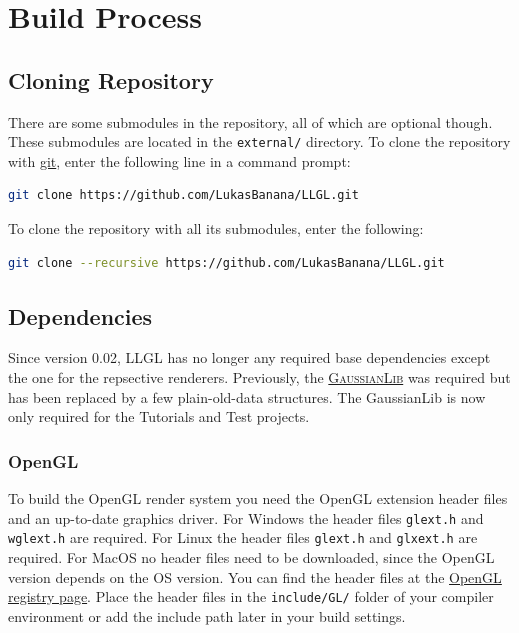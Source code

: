 \documentclass{article}
\begin{document}
\newpage
\section{Build Process}

\subsection{Cloning Repository}

There are some submodules in the \LLGL repository, all of which are optional though.
These submodules are located in the \texttt{external/} directory.
To clone the repository with \href{https://git-scm.com/}{git}, enter the following line in a command prompt:
\begin{lstlisting}[language=sh]
git clone https://github.com/LukasBanana/LLGL.git
\end{lstlisting}
To clone the repository with all its submodules, enter the following:
\begin{lstlisting}[language=sh]
git clone --recursive https://github.com/LukasBanana/LLGL.git
\end{lstlisting}

\subsection{Dependencies}

Since version 0.02, LLGL has no longer any required base dependencies except the one for the repsective renderers.
Previously, the \href{https://github.com/LukasBanana/GaussianLib}{\textsc{GaussianLib}} was required but has been replaced by a few plain-old-data structures.
The GaussianLib is now only required for the Tutorials and Test projects.

\subsubsection{OpenGL}

To build the OpenGL render system you need the OpenGL extension header files and an up-to-date graphics driver.
For Windows the header files \texttt{glext.h} and \texttt{wglext.h} are required.
For Linux the header files \texttt{glext.h} and \texttt{glxext.h} are required.
For MacOS no header files need to be downloaded, since the OpenGL version depends on the OS version.
You can find the header files at the \href{https://www.opengl.org/registry/#headers}{OpenGL registry page}.
Place the header files in the \texttt{include/GL/} folder of your compiler environment
or add the include path later in your build settings.
\end{document}
